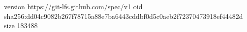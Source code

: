 version https://git-lfs.github.com/spec/v1
oid sha256:dd04c9082b267f78715a88e7ba6443cddbf0d5c0aeb2f72370473918ef44482d
size 183488
